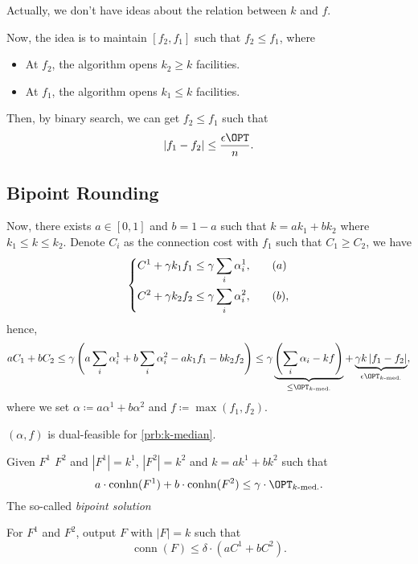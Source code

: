 Actually, we don't have ideas about the relation between \(k\) and \(f\).

Now, the idea is to maintain \([f_2, f_1]\) such that \(f_2 \leq f_1\), where
\begin{itemize}
	\item At \(f_2\), the algorithm opens \(k_2 \geq k\) facilities.
	\item At \(f_1\), the algorithm opens \(k_1 \leq k\) facilities.
\end{itemize}
Then, by binary search, we can get \(f_2 \leq f_1\) such that
\[
	\left\vert f_1 - f_2 \right\vert \leq \frac{\epsilon \OPT}{n}.
\]

\subsection{Bipoint Rounding}

Now, there exists \(a\in [0, 1]\) and \(b = 1 - a\) such that \(k = ak_1 + bk_2\) where \(k_1 \leq k \leq k_2\). Denote \(C_i\) as the connection cost with \(f_1\) such that \(C_1 \geq C_2\), we have
\[
	\begin{dcases}
		C^1 + \gamma k_1 f_1 \leq \gamma \sum_{i} \alpha _i^1, & \quad (a)  \\
		C^2 + \gamma k_2 f_2 \leq \gamma \sum_{i} \alpha _i^2, & \quad (b),
	\end{dcases}
\]
hence,
\[
	aC_1 + bC_2
	\leq \gamma \left( a \sum_{i} \alpha _i^1 + b \sum_{i} \alpha _i^2 - ak_1 f_1 - bk_2 f_2 \right)
	\leq \gamma \underbrace{\left( \sum_{i} \alpha _i - kf \right)}_{\leq \OPT_{\text{\(k\)-med.}}} + \underbrace{\gamma k \left\vert f_1 - f_2 \right\vert}_{\epsilon \OPT_{\text{\(k\)-med.}}},
\]
where we set \(\alpha \coloneqq a \alpha ^1 + b \alpha ^2\) and \(f \coloneqq \max (f_1, f_2)\).

\begin{note}
	\((\alpha , f)\) is dual-feasible for \autoref{prb:k-median}.
\end{note}

\begin{definition}\label{def:bipoint-solution}
	Given \(F^1\)  \(F^2\) and \(\left\vert F^1 \right\vert = k^1\), \(\left\vert F^2 \right\vert = k^2\) and \(k=ak^1 + bk^2\) such that
	\[
		a\cdot \mathop{\mathrm{conhn}}(F^1) + b\cdot \mathop{\mathrm{conhn}}(F^2) \leq \gamma \cdot \OPT_{\text{\(k\)-med.}}.
	\]
	The so-called \emph{bipoint solution}
\end{definition}

\begin{remark}
	For \(F^1\) and \(F^2\), output \(F\) with \(\left\vert F \right\vert = k\) such that
	\[
		\mathop{\mathrm{conn}}(F) \leq \delta \cdot (a C^1 + b C^2).
	\]
\end{remark}

